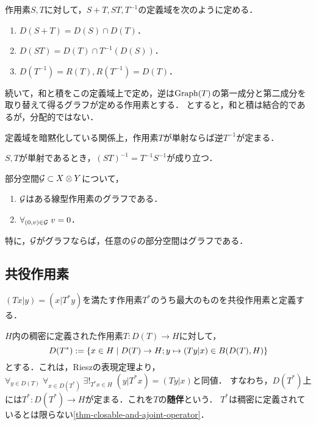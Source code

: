 \documentclass[uplatex,dvipdfmx]{jsreport}
\begin{document}
\begin{definition}[和, 積, 逆]
    作用素$S,T$に対して，$S+T,ST,T^{-1}$の定義域を次のように定める．
    \begin{enumerate}
        \item $D(S+T)=D(S)\cap D(T)$．
        \item $D(ST)=D(T)\cap T^{-1}(D(S))$．
        \item $D(T^{-1})=R(T),R(T^{-1})=D(T)$．
    \end{enumerate}
    続いて，和と積をこの定義域上で定め，逆は$\mathrm{Graph}(T)$の第一成分と第二成分を取り替えて得るグラフが定める作用素とする．
    とすると，和と積は結合的であるが，分配的ではない．
\end{definition}
\begin{remark}
    定義域を暗黙化している関係上，作用素$T$が単射ならば逆$T^{-1}$が定まる．
\end{remark}

\begin{lemma}
    $S,T$が単射であるとき，$(ST)^{-1}=T^{-1}S^{-1}$が成り立つ．
\end{lemma}

\begin{lemma}[グラフの特徴付け]\label{lemma-characterization-of-graph}
    部分空間$\mathcal{G}\subset X\otimes Y$について，
    \begin{enumerate}
        \item $\mathcal{G}$はある線型作用素のグラフである．
        \item $\forall_{(0,v)\in\mathcal{G}}\;v=0$．
    \end{enumerate}
    特に，$\mathcal{G}$がグラフならば，任意の$\mathcal{G}$の部分空間はグラフである．
\end{lemma}

\subsection{共役作用素}

\begin{tcolorbox}[colframe=ForestGreen, colback=ForestGreen!10!white,breakable,colbacktitle=ForestGreen!40!white,coltitle=black,fonttitle=\bfseries\sffamily,
title=]
    $(Tx|y)=(x|T^*y)$を満たす作用素$T^*$のうち最大のものを共役作用素と定義する．
\end{tcolorbox}

\begin{definition}
    $H$内の稠密に定義された作用素$T:D(T)\to H$に対して，
    \[D(T^*):=\left\{x\in H\mid D(T)\to H;y\mapsto(Ty|x)\in B(D(T),H)\right\}\]
    とする．これは，Rieszの表現定理より，$\forall_{y\in D(T)}\;\forall_{x\in D(T^*)}\;\exists!_{T^*x\in H}\;(y|T^*x)=(Ty|x)$と同値．
    すなわち，$D(T^*)$上には$T^*:D(T^*)\to H$が定まる．これを$T$の\textbf{随伴}という．
    $T^*$は稠密に定義されているとは限らない\ref{thm-closable-and-ajoint-operator}．
\end{definition}
\end{document}
